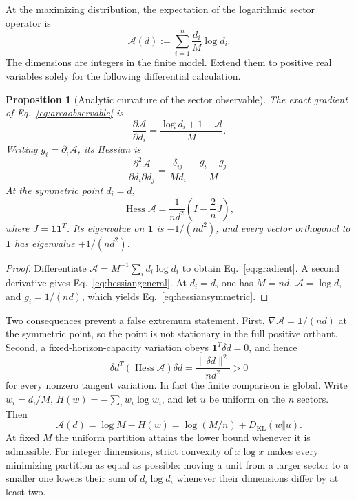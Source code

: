 \documentclass[11pt]{article}
\newtheorem{proposition}[theorem]{Proposition}
\theoremstyle{remark}
\newcommand{\one}{\mathbf 1}
\newcommand{\Hess}{\operatorname{Hess}}
\newcommand{\KL}{D_{\mathrm{KL}}}
\begin{document}
At the maximizing distribution, the expectation of the logarithmic sector
operator is
\begin{equation}
\mathcal A(d)
:=\sum_{i=1}^n\frac{d_i}{M}\log d_i .
\label{eq:areaobservable}
\end{equation}
The dimensions are integers in the finite model. Extend them to positive
real variables solely for the following differential calculation.

\begin{proposition}[Analytic curvature of the sector observable]
\label{prop:hessian}
The exact gradient of Eq.~\eqref{eq:areaobservable} is
\begin{equation}
\frac{\partial\mathcal A}{\partial d_i}
=\frac{\log d_i+1-\mathcal A}{M}.
\label{eq:gradient}
\end{equation}
Writing \(g_i=\partial_i\mathcal A\), its Hessian is
\begin{equation}
\frac{\partial^2\mathcal A}{\partial d_i\partial d_j}
=\frac{\delta_{ij}}{M d_i}-\frac{g_i+g_j}{M}.
\label{eq:hessiangeneral}
\end{equation}
At the symmetric point \(d_i=d\),
\begin{equation}
\Hess\mathcal A
=\frac1{n d^2}\left(I-\frac2nJ\right),
\label{eq:hessiansymmetric}
\end{equation}
where \(J=\one\one^T\). Its eigenvalue on \(\one\) is
\(-1/(nd^2)\), and every vector orthogonal to \(\one\) has eigenvalue
\(+1/(nd^2)\).
\end{proposition}

\begin{proof}
Differentiate \(\mathcal A=M^{-1}\sum_i d_i\log d_i\) to obtain
Eq.~\eqref{eq:gradient}. A second derivative gives
Eq.~\eqref{eq:hessiangeneral}. At \(d_i=d\), one has
\(M=nd\), \(\mathcal A=\log d\), and \(g_i=1/(nd)\), which yields
Eq.~\eqref{eq:hessiansymmetric}.
\end{proof}

Two consequences prevent a false extremum statement. First,
\(\nabla\mathcal A=\one/(nd)\) at the symmetric point, so the point is not
stationary in the full positive orthant. Second, a fixed-horizon-capacity
variation obeys \(\one^T\delta d=0\), and hence
\[
\delta d^T(\Hess\mathcal A)\delta d
=\frac{\|\delta d\|^2}{nd^2}>0
\]
for every nonzero tangent variation. In fact the finite comparison is
global. Write \(w_i=d_i/M\), \(H(w)=-\sum_iw_i\log w_i\), and let \(u\)
be uniform on the \(n\) sectors. Then
\[
\mathcal A(d)=\log M-H(w)=\log(M/n)+\KL(w\Vert u).
\]
At fixed \(M\) the uniform partition attains the lower bound whenever
it is admissible. For integer dimensions, strict convexity of
\(x\log x\) makes every minimizing partition as equal as possible:
moving a unit from a larger sector to a smaller one lowers their sum
of \(d_i\log d_i\) whenever their dimensions differ by at least two.
\end{document}
